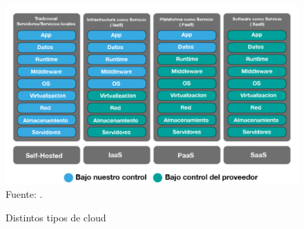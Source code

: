 \begin{enumerate}
		\begin{figure}[h]
			\begin{center}
				\caption{Distintos tipos de cloud}
				\includegraphics[scale=0.5]{Imagenes/Bitmap/distintos_tipos_clouds.png} 
				\footnotesize{Fuente: \citep{cloudPizza2014}.}
				\label{figura_A2}
			\end{center}
		\end{figure}
				
		\newpage %
		

\end{enumerate}
